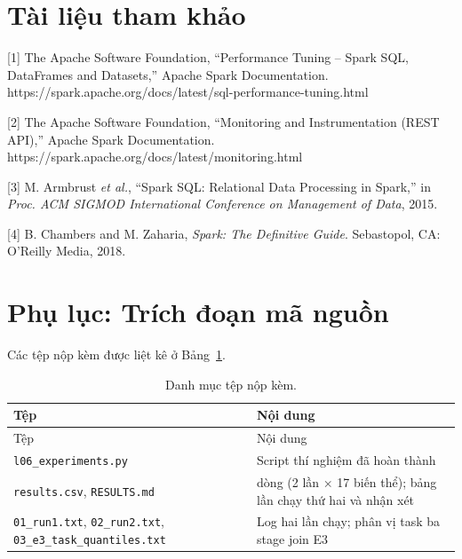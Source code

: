 \documentclass[
  12pt,
  a4paper,
]{article}
\begin{document}
\section*{Tài liệu tham khảo}\label{tuxe0i-liux1ec7u-tham-khux1ea3o}

{[}1{]} The Apache Software Foundation, ``Performance Tuning -- Spark
SQL, DataFrames and Datasets,'' Apache Spark Documentation.
https://spark.apache.org/docs/latest/sql-performance-tuning.html

{[}2{]} The Apache Software Foundation, ``Monitoring and Instrumentation
(REST API),'' Apache Spark Documentation.
https://spark.apache.org/docs/latest/monitoring.html

{[}3{]} M. Armbrust \emph{et al.}, ``Spark SQL: Relational Data
Processing in Spark,'' in \emph{Proc. ACM SIGMOD International
Conference on Management of Data}, 2015.

{[}4{]} B. Chambers and M. Zaharia, \emph{Spark: The Definitive Guide}.
Sebastopol, CA: O'Reilly Media, 2018.

\section*{Phụ lục: Trích đoạn mã
nguồn}\label{phux1ee5-lux1ee5c-truxedch-ux111oux1ea1n-muxe3-nguux1ed3n}

Các tệp nộp kèm được liệt kê ở Bảng~\ref{tbl:l06-files}.

\begin{longtable}[]{@{}
  >{\raggedright\arraybackslash}p{}
  >{\raggedright\arraybackslash}p{}@{}}
\caption{\label{tbl:l06-files}Danh mục tệp nộp kèm.}\tabularnewline
\toprule\noalign{}
\begin{minipage}[b]{\linewidth}\raggedright
Tệp
\end{minipage} & \begin{minipage}[b]{\linewidth}\raggedright
Nội dung
\end{minipage} \\
\midrule\noalign{}
\endfirsthead
\toprule\noalign{}
\begin{minipage}[b]{\linewidth}\raggedright
Tệp
\end{minipage} & \begin{minipage}[b]{\linewidth}\raggedright
Nội dung
\end{minipage} \\
\midrule\noalign{}
\endhead
\bottomrule\noalign{}
\endlastfoot
\texttt{l06\_}\allowbreak{}\texttt{experiments.}\allowbreak{}\texttt{py}\allowbreak{}
& Script thí nghiệm đã hoàn thành \\
\texttt{results.csv}, \texttt{RESULTS.md} & 34 dòng (2 lần × 17 biến
thể); bảng lần chạy thứ hai và nhận xét \\
\texttt{01\_run1.txt}, \texttt{02\_run2.txt},
\texttt{03\_}\allowbreak{}\texttt{e3\_}\allowbreak{}\texttt{task\_}\allowbreak{}\texttt{quantiles.}\allowbreak{}\texttt{txt}\allowbreak{}
& Log hai lần chạy; phân vị task ba stage join E3 \\
\end{longtable}
\end{document}
